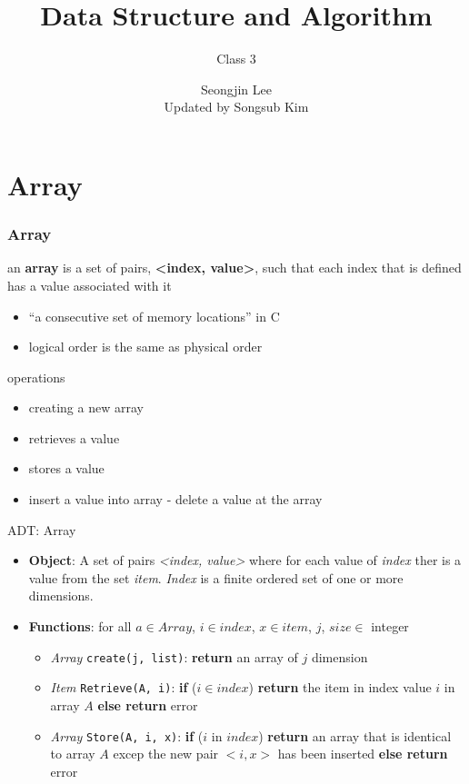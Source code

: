 \documentclass[newPxFont,sthlmFooter,nooffset]{beamer}
\title{Data Structure and Algorithm}
\subtitle{Class 3}
\author[SJL]{Seongjin Lee\\
\footnotesize{Updated by Songsub Kim}}
\institute{\href{mailto:insight@gnu.ac.kr}{insight@gnu.ac.kr}\\\url{http://resourceful.github.io}\\Systems Research Lab.\\GNU}
\date{} %
\begin{document}
\frame[plain,t]{\titlepage} 



\section{Array} 
\begin{frame}
  \frametitle{Array}
an \textbf{array} is a set of pairs, \textbf{<index, value>}, such that each index that is defined has a value associated with it
\begin{itemize}
\item  ``a consecutive set of memory locations'' in C
\item  logical order is the same as physical order
\end{itemize}

operations
\begin{itemize}
\item creating a new array
\item retrieves a value
\item stores a value
\item insert a value into array - delete a value at the array
\end{itemize}
\framebreak

ADT: Array

\begin{itemize}
  \item \textbf{Object}: A set of pairs \textit{<index, value>} where for each value of \textit{index} ther is a value from the set \textit{item}. \textit{Index} is a finite ordered set of one or more dimensions.
  \item \textbf{Functions}: for all $a \in Array$, $i \in index$, $x \in item$, $j$, $size \in $ integer
  \begin{itemize}
    \item \textit{Array} \texttt{create(j, list)}: \textbf{return} an array of $j$ dimension
    \item \textit{Item} \texttt{Retrieve(A, i)}: \textbf{if} ($i \in index$) \textbf{return} the item in index value $i$ in array $A$ \textbf{else return} error 
    \item \textit{Array} \texttt{Store(A, i, x)}: \textbf{if} ($i$ in $index$) \textbf{return} an array that is identical to array $A$ excep the new pair $<i, x>$ has been inserted \textbf{else return} error 
  \end{itemize}
\end{itemize}
\framebreak


\end{frame}
\end{document}
